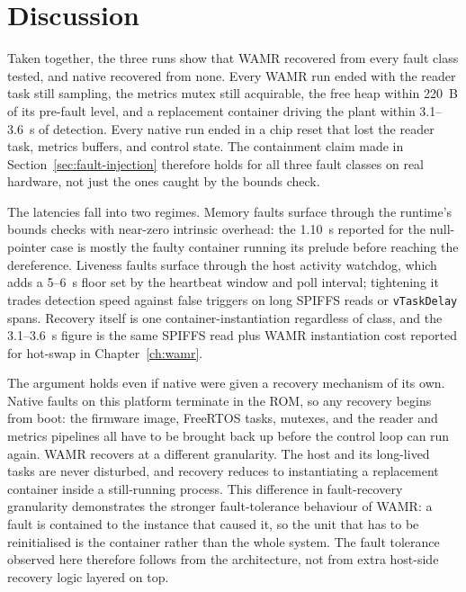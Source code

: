 \documentclass[12pt, a4paper]{report}
\begin{document}
\section{Discussion}
\label{sec:fault_tolerance_discussion}

Taken together, the three runs show that WAMR recovered from every fault class tested, and native recovered from none. Every WAMR run ended with the reader task still sampling, the metrics mutex still acquirable, the free heap within 220~B of its pre-fault level, and a replacement container driving the plant within 3.1--3.6~s of detection. Every native run ended in a chip reset that lost the reader task, metrics buffers, and control state. The containment claim made in Section~\ref{sec:fault-injection} therefore holds for all three fault classes on real hardware, not just the ones caught by the bounds check.

The latencies fall into two regimes. Memory faults surface through the runtime's bounds checks with near-zero intrinsic overhead: the 1.10~s reported for the null-pointer case is mostly the faulty container running its prelude before reaching the dereference. Liveness faults surface through the host activity watchdog, which adds a 5--6~s floor set by the heartbeat window and poll interval; tightening it trades detection speed against false triggers on long SPIFFS reads or \texttt{vTaskDelay} spans. Recovery itself is one container-instantiation regardless of class, and the 3.1--3.6~s figure is the same SPIFFS read plus WAMR instantiation cost reported for hot-swap in Chapter~\ref{ch:wamr}.

The argument holds even if native were given a recovery mechanism of its own. Native faults on this platform terminate in the ROM, so any recovery begins from boot: the firmware image, FreeRTOS tasks, mutexes, and the reader and metrics pipelines all have to be brought back up before the control loop can run again. WAMR recovers at a different granularity. The host and its long-lived tasks are never disturbed, and recovery reduces to instantiating a replacement container inside a still-running process. This difference in fault-recovery granularity demonstrates the stronger fault-tolerance behaviour of WAMR: a fault is contained to the instance that caused it, so the unit that has to be reinitialised is the container rather than the whole system. The fault tolerance observed here therefore follows from the architecture, not from extra host-side recovery logic layered on top.
 
\end{document}
